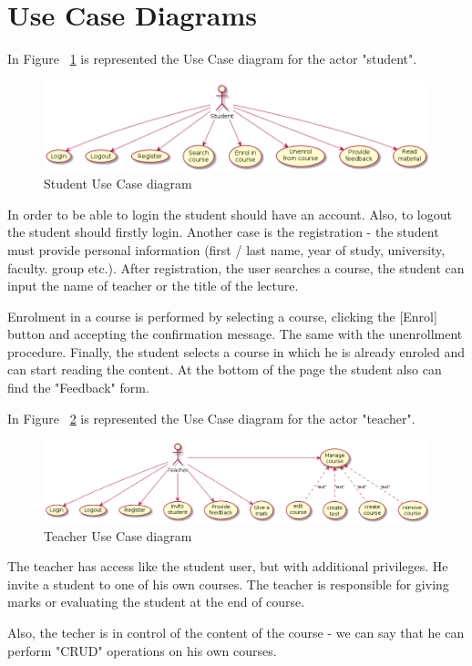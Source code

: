 \documentclass[12pt,a4paper,titlepage]{article}
\begin{document}
\section{Use Case Diagrams}
In Figure ~\ref{fig:student} is represented the Use Case diagram for the actor "student".
\begin{figure}[H]
\centering
\includegraphics[width=\textwidth]{student}
\caption{Student Use Case diagram}
\label{fig:student}
\end{figure}

In order to be able to login the student should have an account. Also, to logout the student should firstly login. Another case is the registration - the student must provide personal information (first / last name, year of study, university, faculty. group etc.). After registration, the user searches a course, the student can input the name of teacher or the title of the lecture.\par
Enrolment in a course is performed by selecting a course, clicking the [Enrol] button and accepting the confirmation message. The same with the unenrollment procedure.
Finally, the student selects a course in which he is already enroled and can start reading the content.
At the bottom of the page the student also can find the "Feedback" form.

In Figure ~\ref{fig:teacher} is represented the Use Case diagram for the actor "teacher".
\begin{figure}[H]
\centering
\includegraphics[width=\textwidth]{teacher}
\caption{Teacher Use Case diagram}
\label{fig:teacher}
\end{figure}
The teacher has access like the student user, but with additional privileges. He invite a student to one of his own courses. The teacher is responsible for giving marks or evaluating the student at the end of course.\par
Also, the techer is in control of the content of the course - we can say that he can perform "CRUD" operations on his own courses.
\end{document}
